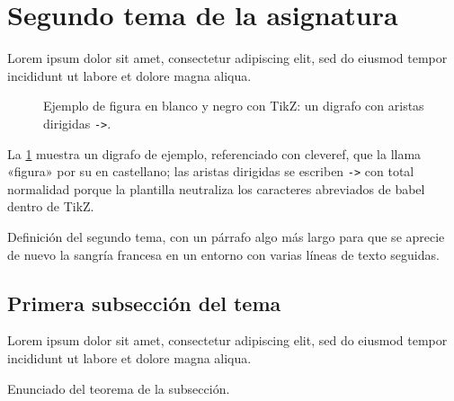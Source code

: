 
\section{Segundo tema de la asignatura}\label{tema:dos}

Lorem ipsum dolor sit amet, consectetur adipiscing elit, sed do
eiusmod tempor incididunt ut labore et dolore magna aliqua.

\begin{figure}[ht]
    \centering
    \caption{Ejemplo de figura en blanco y negro con TikZ: un
    digrafo con aristas dirigidas \texttt{->}.}
    \label{fig:grafo}
\end{figure}

La \cref{fig:grafo} muestra un digrafo de ejemplo, referenciado con
cleveref, que la llama «figura» por su \crefname en castellano; las
aristas dirigidas se escriben \texttt{->} con total normalidad porque
la plantilla neutraliza los caracteres abreviados de babel dentro de
TikZ.

\begin{definicion}
    Definición del segundo tema, con un párrafo algo más largo para
    que se aprecie de nuevo la sangría francesa en un entorno con
    varias líneas de texto seguidas.
\end{definicion}

\subsection{Primera subsección del tema}

Lorem ipsum dolor sit amet, consectetur adipiscing elit, sed do
eiusmod tempor incididunt ut labore et dolore magna aliqua.

\begin{teorema}
    Enunciado del teorema de la subsección.
\end{teorema}

